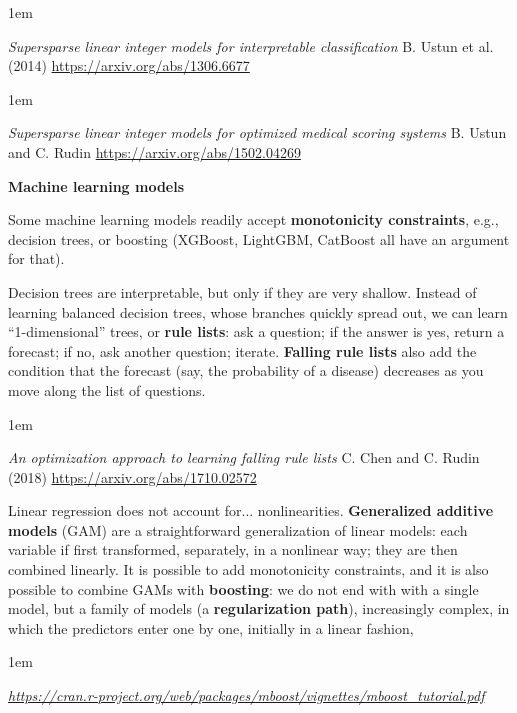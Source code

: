 \documentclass[a5paper]{article}
\let\d\textbf
\newenvironment{reference}{%
  \medskip\goodbreak
  \parskip 0pt
  \raggedright
  \leftskip 1em
  \obeylines
}{\par\medskip\goodbreak}
\def\subsection#1{{\par\bigskip\goodbreak\large\bfseries #1\par}}
\begin{document}
\begin{reference}
  \emph{Supersparse linear integer models for interpretable classification}
  B. Ustun et al. (2014)
  \url{https://arxiv.org/abs/1306.6677}
\end{reference}

\begin{reference}
  \emph{Supersparse linear integer models for optimized medical scoring systems}
  B. Ustun and C. Rudin 
  \url{https://arxiv.org/abs/1502.04269}
\end{reference}

\subsection{Machine learning models}
  
Some machine learning models readily accept \d{monotonicity constraints}, e.g.,
decision trees, or boosting (XGBoost, LightGBM, CatBoost all have an argument for that).
  
Decision trees are interpretable, but only if they are very shallow.
Instead of learning balanced decision trees, whose branches quickly spread out,
we can learn ``1-dimensional'' trees, or \d{rule lists}:
ask a question;
if the answer is yes, return a forecast;
if no, ask another question;
iterate.
\d{Falling rule lists} also add the condition that the forecast (say, the probability of a disease)
decreases as you move along the list of questions.

\begin{reference}
  \emph{An optimization approach to learning falling rule lists}
  C. Chen and C. Rudin (2018)
  \url{https://arxiv.org/abs/1710.02572}
\end{reference}

Linear regression does not account for... nonlinearities.
\d{Generalized additive models} (GAM) are a straightforward generalization of linear models:
each variable if first transformed, separately, in a nonlinear way;
they are then combined linearly.
It is possible to add monotonicity constraints,
and it is also possible to combine GAMs with \d{boosting}:
we do not end with with a single model, but a family of models
(a \d{regularization path}), increasingly complex, in which the
predictors enter one by one, initially in a linear fashion,

\begin{reference}
  \emph{\url{https://cran.r-project.org/web/packages/mboost/vignettes/mboost_tutorial.pdf}}
\end{reference}
\end{document}
